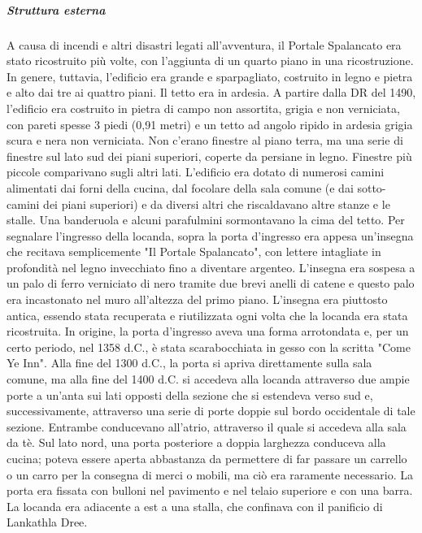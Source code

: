 \documentclass{article}
\begin{document}
                                          \subparagraph{Struttura esterna}
                    A causa di incendi e altri disastri legati all'avventura, il Portale Spalancato era stato ricostruito più volte, con l'aggiunta di un quarto piano in una ricostruzione. In genere, tuttavia, l'edificio era grande e sparpagliato, costruito in legno e pietra e alto dai tre ai quattro piani. Il tetto era in ardesia. A partire dalla DR del 1490, l'edificio era costruito in pietra di campo non assortita, grigia e non verniciata, con pareti spesse 3 piedi (0,91 metri) e un tetto ad angolo ripido in ardesia grigia scura e nera non verniciata. Non c'erano finestre al piano terra, ma una serie di finestre sul lato sud dei piani superiori, coperte da persiane in legno. Finestre più piccole comparivano sugli altri lati. L'edificio era dotato di numerosi camini alimentati dai forni della cucina, dal focolare della sala comune (e dai sotto-camini dei piani superiori) e da diversi altri che riscaldavano altre stanze e le stalle. Una banderuola e alcuni parafulmini sormontavano la cima del tetto.
                    Per segnalare l'ingresso della locanda, sopra la porta d'ingresso era appesa un'insegna che recitava semplicemente "Il Portale Spalancato", con lettere intagliate in profondità nel legno invecchiato fino a diventare argenteo. L'insegna era sospesa a un palo di ferro verniciato di nero tramite due brevi anelli di catene e questo palo era incastonato nel muro all'altezza del primo piano. L'insegna era piuttosto antica, essendo stata recuperata e riutilizzata ogni volta che la locanda era stata ricostruita.
                    In origine, la porta d'ingresso aveva una forma arrotondata e, per un certo periodo, nel 1358 d.C., è stata scarabocchiata in gesso con la scritta "Come Ye Inn". Alla fine del 1300 d.C., la porta si apriva direttamente sulla sala comune, ma alla fine del 1400 d.C. si accedeva alla locanda attraverso due ampie porte a un'anta sui lati opposti della sezione che si estendeva verso sud e, successivamente, attraverso una serie di porte doppie sul bordo occidentale di tale sezione. Entrambe conducevano all'atrio, attraverso il quale si accedeva alla sala da tè. Sul lato nord, una porta posteriore a doppia larghezza conduceva alla cucina; poteva essere aperta abbastanza da permettere di far passare un carrello o un carro per la consegna di merci o mobili, ma ciò era raramente necessario. La porta era fissata con bulloni nel pavimento e nel telaio superiore e con una barra.
                    La locanda era adiacente a est a una stalla, che confinava con il panificio di Lankathla Dree.
\end{document}
